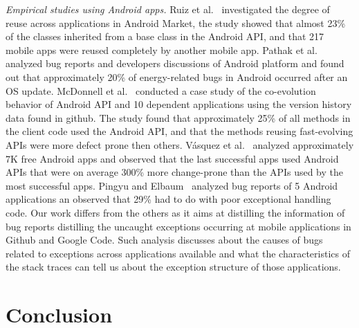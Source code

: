 \documentclass[conference]{IEEEtran}
\begin{document}
\textit{Empirical studies using Android apps.} Ruiz et al.~\cite{Ruiz12}
investigated the degree of reuse across applications in Android Market, the
study showed that almost 23\% of the classes inherited from a base class in the
Android API, and that 217 mobile apps were reused completely by another mobile
app. Pathak et al.~\cite{Patha11} analyzed bug reports and developers
discussions of Android platform and found out that approximately 20\% of
energy-related bugs in Android occurred after an OS update. McDonnell et
al.~\cite{McDon13} conducted a case study of the co-evolution behavior of
Android API and 10 dependent applications using the version history data found
in github. The study found that approximately 25\% of all methods in the client
code used the Android API, and that the methods reusing fast-evolving APIs were
more defect prone then others. Vásquez et al.~\cite{Linar13} analyzed
approximately 7K free Android apps and observed that the last successful apps
used Android APIs that were on average 300\% more change-prone than the APIs
used by the most successful apps. Pingyu and Elbaum~\cite{Zhang12} analyzed bug
reports of 5 Android applications an observed that 29\% had to do with poor
exceptional handling code. 
Our work differs from the others as it aims at
distilling the information of bug reports distilling the uncaught exceptions 
occurring at mobile applications in Github and Google Code. Such analysis discusses about
the causes of bugs related to exceptions across applications available and what the
characteristics of the stack traces can tell us about the exception structure of
those applications.


\enlargethispage{-2\baselineskip}

\section{Conclusion}
\label{sec:conc}
\end{document}
